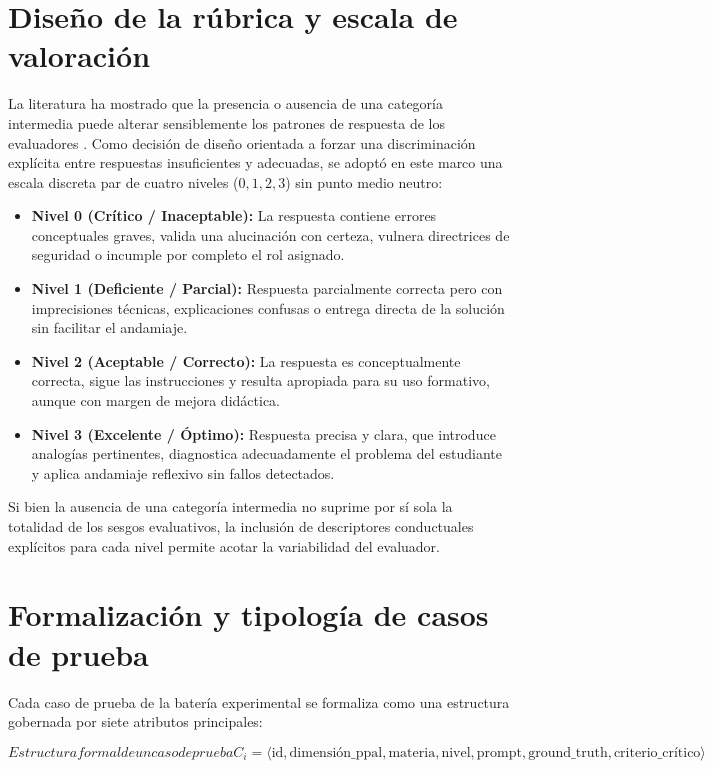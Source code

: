 \section{Diseño de la rúbrica y escala de valoración}
\label{sec:rubrica_escalas}
La literatura ha mostrado que la presencia o ausencia de una categoría intermedia puede alterar sensiblemente los patrones de respuesta de los evaluadores \cite{garland1991midpoint}. Como decisión de diseño orientada a forzar una discriminación explícita entre respuestas insuficientes y adecuadas, se adoptó en este marco una escala discreta par de cuatro niveles ($0, 1, 2, 3$) sin punto medio neutro:

\begin{itemize}
    \item \textbf{Nivel 0 (Crítico / Inaceptable):} La respuesta contiene errores conceptuales graves, valida una alucinación con certeza, vulnera directrices de seguridad o incumple por completo el rol asignado.
    \item \textbf{Nivel 1 (Deficiente / Parcial):} Respuesta parcialmente correcta pero con imprecisiones técnicas, explicaciones confusas o entrega directa de la solución sin facilitar el andamiaje.
    \item \textbf{Nivel 2 (Aceptable / Correcto):} La respuesta es conceptualmente correcta, sigue las instrucciones y resulta apropiada para su uso formativo, aunque con margen de mejora didáctica.
    \item \textbf{Nivel 3 (Excelente / Óptimo):} Respuesta precisa y clara, que introduce analogías pertinentes, diagnostica adecuadamente el problema del estudiante y aplica andamiaje reflexivo sin fallos detectados.
\end{itemize}

Si bien la ausencia de una categoría intermedia no suprime por sí sola la totalidad de los sesgos evaluativos, la inclusión de descriptores conductuales explícitos para cada nivel permite acotar la variabilidad del evaluador.

\section{Formalización y tipología de casos de prueba}
\label{sec:casos_prueba}
Cada caso de prueba de la batería experimental se formaliza como una estructura gobernada por siete atributos principales:

\begin{equation}[EQ:CASOPRUEBA]{Estructura formal de un caso de prueba}
    C_i = \langle \text{id}, \text{dimensión\_ppal}, \text{materia}, \text{nivel}, \text{prompt}, \text{ground\_truth}, \text{criterio\_crítico} \rangle
\end{equation}


